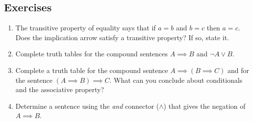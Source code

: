 \documentclass[10pt,]{book}
\theoremstyle{plain}
\theoremstyle{definition}
\theoremstyle{definition}
\numberwithin{equation}{section}
\newcommand{\hrulethin}  {\noalign{\hrule height 0.04em}}
\newcommand{\hint}[1]{ }
\begin{document}
\subsection[{Exercises}]{Exercises}\label{exercises-9}
\leavevmode%
\begin{enumerate}[label=(\alph*)]
\item\hypertarget{li-113}{}
        The transitive property of equality says that if \(a=b\) and \(b=c\)
        then \(a=c\).  Does the implication arrow satisfy a transitive property?
        If so, state it.



        \hint{
        I sometimes like to rephrase the implication \(X \implies Y\) as ``X's truth forces Y to be true.''  Does that help?
        If we know that X being true forces Y to be true, and we also know that Y being true will force Z to be true, what can we conclude?



        }
\item\hypertarget{li-114}{}
        Complete truth tables for the compound sentences \(A \implies B\) and
          \({\lnot}A \lor B\).
  
  
  
        \hint{
        You should definitely be able to do this one on your own, but anyway, here's an outline of the table:
        \begin{tabular}{llll}
&&&\tabularnewline\hrulethin
\(A\)&\(B\)&\(A \implies B\)&\({\lnot}A \lor B\)\tabularnewline[0pt]
&&&\tabularnewline\hrulethin
\(T\)&\(T\)&&\tabularnewline[0pt]
&&&\tabularnewline\hrulethin
\(T\)&\(\phi\)&&\tabularnewline[0pt]
&&&\tabularnewline\hrulethin
\(\phi\)&\(T\)&&\tabularnewline[0pt]
&&&\tabularnewline\hrulethin
\(\phi\)&\(\phi\)&&\tabularnewline[0pt]
&&&\tabularnewline\hrulethin
\end{tabular}

        }
\item\hypertarget{li-115}{}
        Complete a truth table for the compound sentence \(A \implies (B \implies C)\) and for the sentence \((A \implies B) \implies C\).  What can you conclude
        about conditionals and the associative property?



        \hint{
        No help on this one other than to say that the associative property \emph{does not} hold for implications.



        }
\item\hypertarget{li-116}{}
        Determine a sentence using the \emph{and} connector (\(\land\)) that
        gives the negation of \(A \implies B\).




\end{enumerate}
\end{document}
